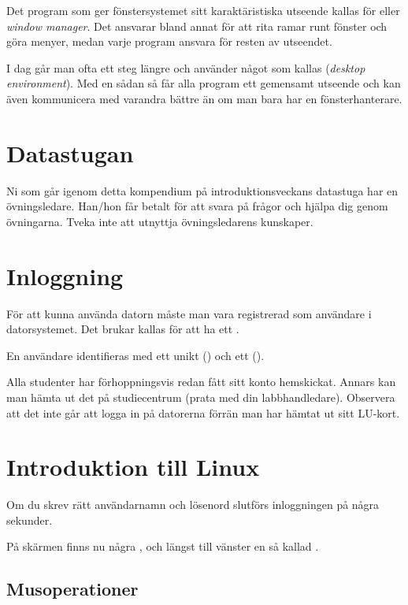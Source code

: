 \documentclass[a4paper,twocolumn]{book}
\begin{document}
Det program som ger fönstersystemet sitt karaktäristiska utseende
kallas för  eller \emph{window manager}. Det
ansvarar bland annat för att rita ramar runt fönster och göra menyer, medan
varje program ansvara för resten av utseendet.

I dag går man ofta ett steg längre och använder något som kallas
 (\emph{desktop environment}). Med en sådan så får
alla program ett gemensamt utseende och kan även kommunicera med varandra
bättre än om man bara har en fönsterhanterare.

\section{Datastugan}

Ni som går igenom detta kompendium på introduktionsveckans datastuga
har en övningsledare. Han/hon får betalt för att svara på frågor och
hjälpa dig genom övningarna. Tveka inte att utnyttja övningsledarens
kunskaper. 


\section{Inloggning}

För att kunna använda datorn måste man vara registrerad som användare
i datorsystemet. Det brukar kallas för att ha ett .

En användare identifieras med ett unikt 
() och ett  ().

Alla studenter har förhoppningsvis redan fått sitt konto hemskickat. Annars
kan man hämta ut det på studiecentrum (prata med din labbhandledare). Observera att det inte går att logga in
på datorerna förrän man har hämtat ut sitt LU-kort.


\section{Introduktion till Linux}

Om du skrev rätt användarnamn och lösenord slutförs inloggningen på några
sekunder.

På skärmen finns nu några , och längst till vänster  en så kallad
.


\subsection{Musoperationer} %
\end{document}
